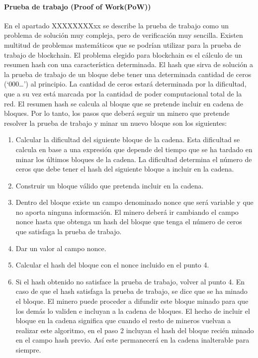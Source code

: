 \paragraph{Prueba de trabajo (Proof of Work(PoW))}
En el apartado XXXXXXXXxx se describe la prueba de trabajo como un problema de solución muy compleja, pero de verificación muy sencilla. Existen multitud de problemas matemáticos que se podrían utilizar para la prueba de trabajo de blockchain. El problema elegido para blockchain es el cálculo de un resumen hash con una característica determinada. El hash que sirva de solución a la prueba de trabajo de un bloque debe tener una determinada cantidad de ceros (‘000…’) al principio. La cantidad de ceros estará determinada por la dificultad, que a su vez está marcada por la cantidad de poder computacional total de la red. El resumen hash se calcula al bloque que se pretende incluir en cadena de bloques.
Por lo tanto, los pasos que deberá seguir un minero que pretende resolver la prueba de trabajo y minar un nuevo bloque son los siguientes:
\begin{enumerate}
	\item Calcular la dificultad del siguiente bloque de la cadena. Esta dificultad se calcula en base a una expresión que depende del tiempo que se ha tardado en minar los últimos bloques de la cadena. La dificultad determina el número de ceros que debe tener el hash del siguiente bloque a incluir en la cadena.
	\item Construir un bloque válido que pretenda incluir en la cadena.
	\item Dentro del bloque existe un campo denominado nonce que será variable y que no aporta ninguna información. El minero deberá ir cambiando el campo nonce hasta que obtenga un hash del bloque que tenga el número de ceros que satisfaga la prueba de trabajo.
	\item Dar un valor al campo nonce.
	\item Calcular el hash del bloque con el nonce incluido en el punto 4.
	\item Si el hash obtenido no satisface la prueba de trabajo, volver al punto 4. En caso de que el hash satisfaga la prueba de trabajo, se dice que se ha minado el bloque. El minero puede proceder a difundir este bloque minado para que los demás lo validen e incluyan a la cadena de bloques. El hecho de incluir el bloque en la cadena significa que cuando el resto de mineros vuelvan a realizar este algoritmo, en el paso 2 incluyan el hash del bloque recién minado en el campo hash previo. Así este permanecerá en la cadena inalterable para siempre.
\end{enumerate}

